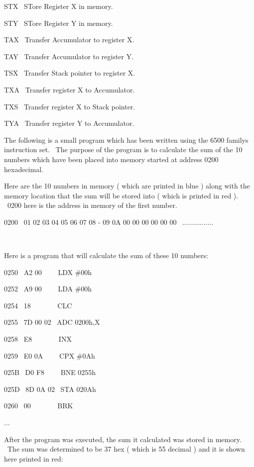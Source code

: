 \documentclass[12pt,twoside]{book}
\begin{document}
STX \ STore Register X in memory.

STY \ STore Register Y in memory.

TAX \ Transfer Accumulator to register X.

TAY \ Transfer Accumulator to register Y.

TSX \ Transfer Stack pointer to register X.

TXA \ Transfer register X to Accumulator.

TXS \ Transfer register X to Stack pointer.

TYA \ Transfer register Y to Accumulator.


\bigskip

The following is a small program which has been written using the 6500 family{\textquotesingle}s instruction set. \ The purpose of the program is to calculate the sum of the 10 numbers which have been placed into memory started at address 0200 hexadecimal. 

\bigskip

Here are the 10 numbers in memory ( which are printed in blue ) along with the memory location that the sum will be stored into ( which is printed in red ). \ 0200 here is the address in memory of the first number. 

\bigskip

0200 \ 01 02 03 04 05 06 07 08 {}- 09 0A 00 00 00 00 00 00
\ ................

\ 

Here is a program that will calculate the sum of these 10 numbers:


\bigskip

0250 \ A2 00 \ \ \ \ LDX \#00h

0252 \ A9 00 \ \ \ \ LDA \#00h

0254 \ 18 \ \ \ \ \ \ \ CLC 

0255 \ 7D 00 02 \ ADC 0200h,X

0258 \ E8 \ \ \ \ \ \ \ INX 

0259 \ E0 0A \ \ \ \ CPX \#0Ah

025B \ D0 F8 \ \ \ \ BNE 0255h

025D \ 8D 0A 02 \ STA 020Ah

0260 \ 00 \ \ \ \ \ \ \ BRK 

...


\bigskip

After the program was executed, the sum it calculated was stored in memory. \ The sum was determined to be 37 hex ( which is 55 decimal ) and it is shown here printed in red: 
\end{document}
